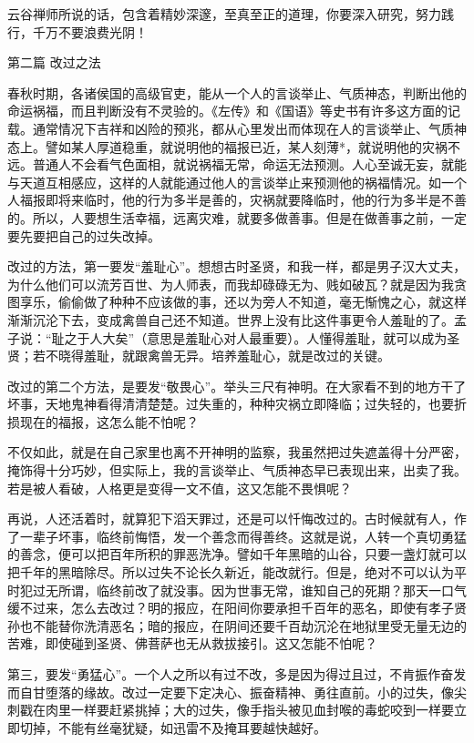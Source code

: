 \documentclass[12pt,UTF8]{ctexbook}
\begin{document}
云谷禅师所说的话，包含着精妙深邃，至真至正的道理，你要深入研究，努力践行，千万不要浪费光阴！


第二篇 改过之法

春秋时期，各诸侯国的高级官吏，能从一个人的言谈举止、气质神态，判断出他的命运祸福，而且判断没有不灵验的。《左传》和《国语》等史书有许多这方面的记载。通常情况下吉祥和凶险的预兆，都从心里发出而体现在人的言谈举止、气质神态上。譬如某人厚道稳重，就说明他的福报已近，某人刻薄*，就说明他的灾祸不远。普通人不会看气色面相，就说祸福无常，命运无法预测。人心至诚无妄，就能与天道互相感应，这样的人就能通过他人的言谈举止来预测他的祸福情况。如一个人福报即将来临时，他的行为多半是善的，灾祸就要降临时，他的行为多半是不善的。所以，人要想生活幸福，远离灾难，就要多做善事。但是在做善事之前，一定要先要把自己的过失改掉。

改过的方法，第一要发“羞耻心”。想想古时圣贤，和我一样，都是男子汉大丈夫，为什么他们可以流芳百世、为人师表，而我却碌碌无为、贱如破瓦？就是因为我贪图享乐，偷偷做了种种不应该做的事，还以为旁人不知道，毫无惭愧之心，就这样渐渐沉沦下去，变成禽兽自己还不知道。世界上没有比这件事更令人羞耻的了。孟子说：“耻之于人大矣”（意思是羞耻心对人最重要）。人懂得羞耻，就可以成为圣贤；若不晓得羞耻，就跟禽兽无异。培养羞耻心，就是改过的关键。

改过的第二个方法，是要发“敬畏心”。举头三尺有神明。在大家看不到的地方干了坏事，天地鬼神看得清清楚楚。过失重的，种种灾祸立即降临；过失轻的，也要折损现在的福报，这怎么能不怕呢？

不仅如此，就是在自己家里也离不开神明的监察，我虽然把过失遮盖得十分严密，掩饰得十分巧妙，但实际上，我的言谈举止、气质神态早已表现出来，出卖了我。若是被人看破，人格更是变得一文不值，这又怎能不畏惧呢？

再说，人还活着时，就算犯下滔天罪过，还是可以忏悔改过的。古时候就有人，作了一辈子坏事，临终前悔悟，发一个善念而得善终。这就是说，人转一个真切勇猛的善念，便可以把百年所积的罪恶洗净。譬如千年黑暗的山谷，只要一盏灯就可以把千年的黑暗除尽。所以过失不论长久新近，能改就行。但是，绝对不可以认为平时犯过无所谓，临终前改了就没事。因为世事无常，谁知自己的死期？那天一口气缓不过来，怎么去改过？明的报应，在阳间你要承担千百年的恶名，即使有孝子贤孙也不能替你洗清恶名；暗的报应，在阴间还要千百劫沉沦在地狱里受无量无边的苦难，即使碰到圣贤、佛菩萨也无从救拔接引。这又怎能不怕呢？

第三，要发“勇猛心”。一个人之所以有过不改，多是因为得过且过，不肯振作奋发而自甘堕落的缘故。改过一定要下定决心、振奋精神、勇往直前。小的过失，像尖刺戳在肉里一样要赶紧挑掉；大的过失，像手指头被见血封喉的毒蛇咬到一样要立即切掉，不能有丝毫犹疑，如迅雷不及掩耳要越快越好。
\end{document}
